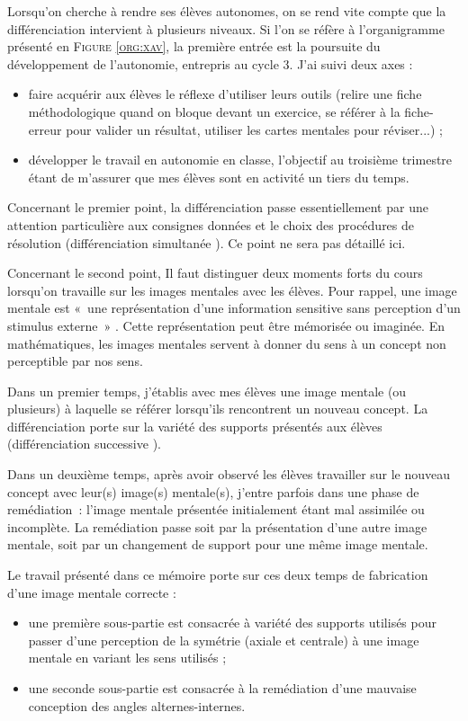 Lorsqu'on cherche à rendre ses élèves autonomes, on se rend vite compte que la différenciation intervient à plusieurs niveaux. Si l'on se réfère à l'organigramme présenté en \textsc{Figure \ref{org:xav}}, la première entrée est la poursuite du développement de l'autonomie, entrepris au cycle 3. J'ai suivi deux axes :
\begin{itemize}
    \item faire acquérir aux élèves le réflexe d'utiliser leurs outils (relire une fiche méthodologique quand on bloque devant un exercice, se référer à la fiche-erreur pour valider un résultat, utiliser les cartes mentales pour réviser...) ;
    \item développer le travail en autonomie en classe, l'objectif au troisième trimestre étant de m'assurer que mes élèves sont en activité un tiers du temps.
\end{itemize}
Concernant le premier point, la différenciation passe essentiellement par une attention particulière aux consignes données et le choix des procédures de résolution (différenciation simultanée \cite{Eduscol}). Ce point ne sera pas détaillé ici.

Concernant le second point, Il faut distinguer deux moments forts du cours lorsqu'on travaille sur les images mentales avec les élèves. Pour rappel, une image mentale est « une représentation d'une information sensitive sans perception d'un stimulus externe » \cite{mimagery}. Cette représentation peut être mémorisée ou imaginée. En mathématiques, les images mentales servent à donner du sens à un concept non perceptible par nos sens.

Dans un premier temps, j'établis avec mes élèves une image mentale (ou plusieurs) à laquelle se référer lorsqu'ils rencontrent un nouveau concept. La différenciation porte sur la variété des supports présentés aux élèves (différenciation successive \cite{Eduscol}).

Dans un deuxième temps, après avoir observé les élèves travailler sur le nouveau concept avec leur(s) image(s) mentale(s), j'entre parfois dans une phase de remédiation : l'image mentale présentée initialement étant mal assimilée ou incomplète. La remédiation passe soit par la présentation d'une autre image mentale, soit par un changement de support pour une même image mentale.

Le travail présenté dans ce mémoire porte sur ces deux temps de fabrication d'une image mentale correcte :
\begin{itemize}
    \item une première sous-partie est consacrée à variété des supports utilisés pour passer d'une perception de la symétrie (axiale et centrale) à une image mentale en variant les sens utilisés ;
    \item une seconde sous-partie est consacrée à la remédiation d'une mauvaise conception des angles alternes-internes.
\end{itemize}

